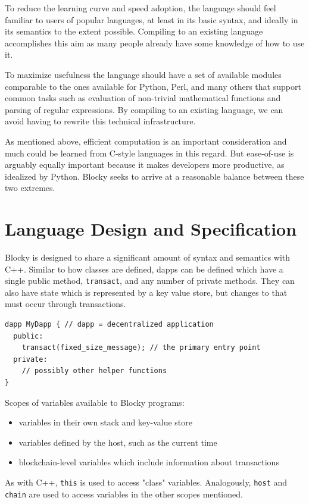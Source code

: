 \documentclass[letterpaper]{article}
\begin{document}
To reduce the learning curve and speed adoption, the language should feel familiar to users of popular languages, at least in its basic syntax, and ideally in its semantics to the extent possible. Compiling to an existing language accomplishes this aim as many people already have some knowledge of how to use it.

To maximize usefulness the language should have a set of available modules comparable to the ones available for Python, Perl, and many others that support common tasks such as evaluation of non-trivial mathematical functions and parsing of regular expressions. By compiling to an existing language, we can avoid having to rewrite this technical infrastructure.

As mentioned above, efficient computation is an important consideration and much could be learned from C-style languages in this regard. But ease-of-use is arguably equally important because it makes developers more productive, as idealized by Python. Blocky seeks to arrive at a reasonable balance between these two extremes.

\section{Language Design and Specification}

Blocky is designed to share a significant amount of syntax and semantics with C++. Similar to how classes are defined, dapps can be defined which have a single public method, \texttt{transact}, and any number of private methods. They can also have state which is represented by a key value store, but changes to that must occur through transactions.
\begin{lstlisting}
dapp MyDapp { // dapp = decentralized application
  public:
    transact(fixed_size_message); // the primary entry point
  private:
    // possibly other helper functions
}
\end{lstlisting}


Scopes of variables available to Blocky programs:
\begin{itemize}
  \item{variables in their own stack and key-value store}
  \item{variables defined by the host, such as the current time}
  \item{blockchain-level variables which include information about transactions}
\end{itemize}
As with C++, \texttt{this} is used to access "class" variables. Analogously, \texttt{host} and \texttt{chain} are used to access variables in the other scopes mentioned.
\newline
\end{document}
